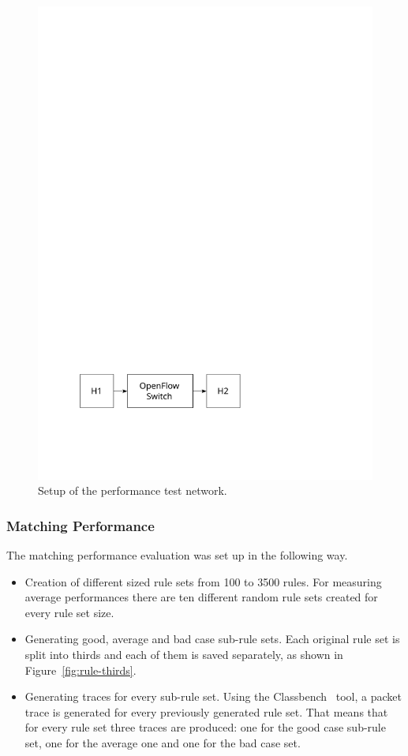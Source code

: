 \documentclass[a4paper,
		12pt,
		parskip=full,
		titlepage
		]{scrartcl}
\begin{document}
\begin{figure}
\centering
\includegraphics[height=0.1\textheight]{images/ofswitch-perftest}
\caption{Setup of the performance test network.}
\label{fig:ofswitch-perftest}
\end{figure}

\subsubsection{Matching Performance}
The matching performance evaluation was set up in the following way.
\begin{itemize}
    \item Creation of different sized rule sets from 100 to 3500 rules.
        For measuring average performances there are ten different random rule sets created for every rule set size.
    \item Generating good, average and bad case sub-rule sets. 
        Each original rule set is split into thirds and each of them is saved separately, 
        as shown in Figure~\ref{fig:rule-thirds}.
    \item Generating traces for every sub-rule set.
        Using the Classbench~\cite{classbench_website} tool, a packet trace is generated for every previously generated rule set.
        That means that for every rule set three traces are produced: 
        one for the good case sub-rule set, one for the average one and one for the bad case set.
\end{itemize}
\end{document}
